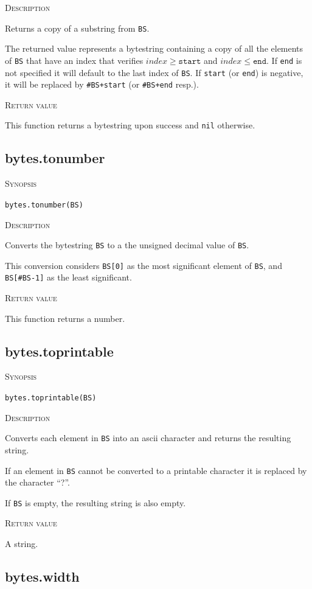 \documentclass[11pt]{report}
\newcommand{\mansection}[1]{\vspace{0.5em}\par\noindent\textsc{#1}\vspace{0.5em}\par}
\newcommand{\syn}[1]{\texttt{#1}}
\begin{document}
\mansection{Description}
  Returns a copy of a substring from \syn{BS}.

  The returned value represents a bytestring containing a copy of all the 
  elements of \syn{BS} that have an index that verifies $index \geq \syn{start}$ and 
  $index \leq \syn{end}$.
  If \syn{end} is not specified it will default to the last index of \syn{BS}.
  If \syn{start} (or \syn{end}) is negative, it will be replaced by \syn{\#BS+start}
  (or \syn{\#BS+end} resp.).

\mansection{Return value}
  This function returns a bytestring upon success and \syn{nil} otherwise.


\subsection{bytes.tonumber}

\mansection{Synopsis}
\syn{bytes.tonumber(BS)}

\mansection{Description}
  Converts the bytestring \syn{BS} to a the unsigned decimal value of \syn{BS}.

  This conversion considers \syn{BS[0]} as the most significant element of \syn{BS}, 
  and \syn{BS[\#BS-1]} as the least significant. 
  
\mansection{Return value}
  This function returns a number.

\subsection{bytes.toprintable}

\mansection{Synopsis}
\syn{bytes.toprintable(BS)}

\mansection{Description}
  Converts each element in \syn{BS} into an ascii character and returns the
  resulting string.

  If an element in \syn{BS} cannot be converted to a printable character it
  is replaced by the character ``?''. 

  If \syn{BS} is empty, the resulting string is also empty.

\mansection{Return value}
  A string.


\subsection{bytes.width}
\end{document}
